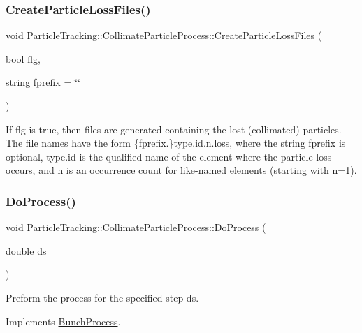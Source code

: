 \subsubsection{\texorpdfstring{Create\+Particle\+Loss\+Files()}{CreateParticleLossFiles()}}
{\footnotesize\ttfamily void Particle\+Tracking\+::\+Collimate\+Particle\+Process\+::\+Create\+Particle\+Loss\+Files (\begin{DoxyParamCaption}\item[{bool}]{flg,  }\item[{string}]{fprefix = {\ttfamily \char`\"{}\char`\"{}} }\end{DoxyParamCaption})\hspace{0.3cm}{\ttfamily [inline]}}

If flg is true, then files are generated containing the lost (collimated) particles. The file names have the form \{fprefix.\}type.\+id.\+n.\+loss, where the string fprefix is optional, type.\+id is the qualified name of the element where the particle loss occurs, and n is an occurrence count for like-\/named elements (starting with n=1). \mbox{\label{classParticleTracking_1_1CollimateParticleProcess_a0e987f9ad599b59c82751cceff1b97f9}} 
\subsubsection{\texorpdfstring{Do\+Process()}{DoProcess()}}
{\footnotesize\ttfamily void Particle\+Tracking\+::\+Collimate\+Particle\+Process\+::\+Do\+Process (\begin{DoxyParamCaption}\item[{double}]{ds }\end{DoxyParamCaption})\hspace{0.3cm}{\ttfamily [virtual]}}

Preform the process for the specified step ds. 

Implements \hyperlink{classBunchProcess}{Bunch\+Process}.

\mbox{\label{classParticleTracking_1_1CollimateParticleProcess_a12c96ec3f91752f211c135f96ba2248c}} 
